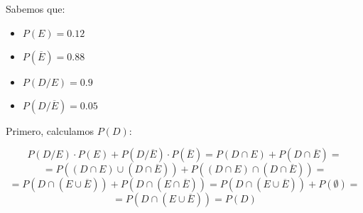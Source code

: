 \documentclass[11pt]{article}
\begin{document}
Sabemos que: 
\begin{itemize}
    \item $P(E) = 0.12$
    \item $P(\overline{E}) = 0.88$
    \item $P(D/E) = 0.9$
    \item $P(D/\overline{E}) = 0.05$
\end{itemize}

Primero, calculamos $P(D)$:


$$P(D/E) \cdot P(E) + P(D/\overline{E}) \cdot P(\overline{E}) = P(D \cap E) + P(D \cap \overline{E}) = $$
$$ = P((D \cap E) \cup (D \cap \overline{E})) + P((D \cap E) \cap (D \cap \overline{E})) = $$
$$ = P(D \cap (E \cup \overline{E})) + P(D \cap (E \cap \overline{E})) = P(D \cap (E \cup \overline{E})) + P(\emptyset) = $$
$$ = P(D \cap (E \cup \overline{E})) = P(D) $$
\end{document}
